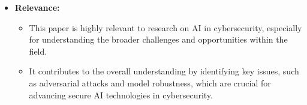 \documentclass{article}  %
\begin{document}
\begin{itemize}
\begin{itemize}
\begin{itemize}
        \end{itemize}
        \item \textbf{Relevance:} 
        \begin{itemize}
            \item This paper is highly relevant to research on AI in cybersecurity, especially for understanding the broader challenges and opportunities within the field. 
            \item It contributes to the overall understanding by identifying key issues, such as adversarial attacks and model robustness, which are crucial for advancing secure AI technologies in cybersecurity.
        \end{itemize}
    \end{itemize}
    
    \vspace{0.2cm}
    

\end{itemize}
\end{document}
